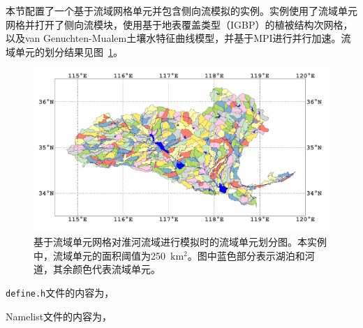 本节配置了一个基于流域网格单元并包含侧向流模拟的实例。实例使用了流域单元网格并打开了侧向流模块，使用基于地表覆盖类型（IGBP）的植被结构次网格，以及van Genuchten-Mualem土壤水特征曲线模型，并基于MPI进行并行加速。流域单元的划分结果见图~\ref{fig:fig_huaihe}。

\begin{figure}[htpb]
    \centering
    \includegraphics[width=\textwidth]{figures/CatchmentMesh_Huaihe.pdf}
    \caption{基于流域单元网格对淮河流域进行模拟时的流域单元划分图。本实例中，流域单元的面积阈值为250~$\mathrm{km^2}$。图中蓝色部分表示湖泊和河道，其余颜色代表流域单元。}
    \label{fig:fig_huaihe}
\end{figure}

\texttt{define.h}文件的内容为，


Namelist文件的内容为，


